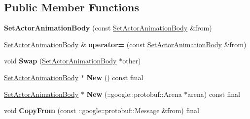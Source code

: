 \subsection*{Public Member Functions}
\begin{DoxyCompactItemize}
\item 
\mbox{\label{classtbBasics_1_1SetActorAnimationBody_a135062fa8edb9ceb2d0cd7cd33d4a0d9}} 
{\bfseries Set\+Actor\+Animation\+Body} (const \hyperlink{classtbBasics_1_1SetActorAnimationBody}{Set\+Actor\+Animation\+Body} \&from)
\item 
\mbox{\label{classtbBasics_1_1SetActorAnimationBody_a903dda0b51a7a3890ee3c24f15aeb4ec}} 
\hyperlink{classtbBasics_1_1SetActorAnimationBody}{Set\+Actor\+Animation\+Body} \& {\bfseries operator=} (const \hyperlink{classtbBasics_1_1SetActorAnimationBody}{Set\+Actor\+Animation\+Body} \&from)
\item 
\mbox{\label{classtbBasics_1_1SetActorAnimationBody_a4663bddbd71866704b171cbbda4f3f9d}} 
void {\bfseries Swap} (\hyperlink{classtbBasics_1_1SetActorAnimationBody}{Set\+Actor\+Animation\+Body} $\ast$other)
\item 
\mbox{\label{classtbBasics_1_1SetActorAnimationBody_afb923abda03db054386fdbb683796314}} 
\hyperlink{classtbBasics_1_1SetActorAnimationBody}{Set\+Actor\+Animation\+Body} $\ast$ {\bfseries New} () const final
\item 
\mbox{\label{classtbBasics_1_1SetActorAnimationBody_a7c60e6aa02f4d3e9301e37034956fd87}} 
\hyperlink{classtbBasics_1_1SetActorAnimationBody}{Set\+Actor\+Animation\+Body} $\ast$ {\bfseries New} (\+::google\+::protobuf\+::\+Arena $\ast$arena) const final
\item 
\mbox{\label{classtbBasics_1_1SetActorAnimationBody_a48ed92222719bd4f411b8365dc6b1494}} 
void {\bfseries Copy\+From} (const \+::google\+::protobuf\+::\+Message \&from) final
\item 
\mbox{\label{classtbBasics_1_1SetActorAnimationBody_a0e8c37f22267fed635fa6ba8e1250642}} 

\end{DoxyCompactItemize}

